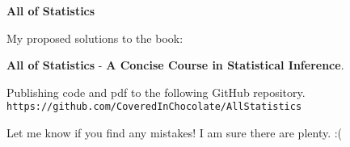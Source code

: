 \noindent
{\Huge \textbf{All of Statistics}}

\bigskip\noindent
My proposed solutions to the book:

\medskip\noindent
{\Large\textbf{All of Statistics}} - \textbf{A Concise Course in Statistical Inference}.%

\medskip\noindent
Publishing code and pdf to the following GitHub repository.\\
\texttt{https://github.com/CoveredInChocolate/AllStatistics}

\bigskip\noindent
Let me know if you find any mistakes! I am sure there are plenty. :(

\tableofcontents